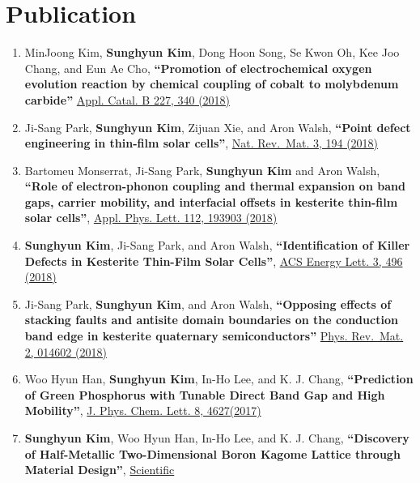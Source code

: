 \hypertarget{publication}{%
\section{Publication}\label{publication}}

\begin{enumerate}
\def\labelenumi{\arabic{enumi}.}
\item
  MinJoong Kim, \textbf{Sunghyun Kim}, Dong Hoon Song, Se Kwon Oh, Kee
  Joo Chang, and Eun Ae Cho, \textbf{``Promotion of electrochemical
  oxygen evolution reaction by chemical coupling of cobalt to molybdenum
  carbide''} \href{https://doi.org/10.1016/j.apcatb.2018.01.051}{Appl.
  Catal. B 227, 340 (2018)}
\item
  Ji-Sang Park, \textbf{Sunghyun Kim}, Zijuan Xie, and Aron Walsh,
  \textbf{``Point defect engineering in thin-film solar cells''},
  \href{https://doi.org/10.1038/s41578-018-0026-7}{Nat. Rev.~Mat. 3, 194
  (2018)}
\item
  Bartomeu Monserrat, Ji-Sang Park, \textbf{Sunghyun Kim} and Aron
  Walsh, \textbf{``Role of electron-phonon coupling and thermal
  expansion on band gaps, carrier mobility, and interfacial offsets in
  kesterite thin-film solar cells''},
  \href{https://doi.org/10.1063/1.5028186}{Appl. Phys. Lett. 112, 193903
  (2018)}
\item
  \textbf{Sunghyun Kim}, Ji-Sang Park, and Aron Walsh,
  \textbf{``Identification of Killer Defects in Kesterite Thin-Film
  Solar Cells''},
  \href{https://pubs.acs.org/doi/abs/10.1021/acsenergylett.7b01313}{ACS
  Energy Lett. 3, 496 (2018)}
\item
  Ji-Sang Park, \textbf{Sunghyun Kim}, and Aron Walsh,
  \textbf{``Opposing effects of stacking faults and antisite domain
  boundaries on the conduction band edge in kesterite quaternary
  semiconductors''}
  \href{https://journals.aps.org/prmaterials/abstract/10.1103/PhysRevMaterials.2.014602}{Phys.
  Rev.~Mat. 2, 014602 (2018)}
\item
  Woo Hyun Han, \textbf{Sunghyun Kim}, In-Ho Lee, and K. J. Chang,
  \textbf{``Prediction of Green Phosphorus with Tunable Direct Band Gap
  and High Mobility''},
  \href{https://pubs.acs.org/doi/10.1021/acs.jpclett.7b02153}{J. Phys.
  Chem. Lett. 8, 4627(2017)}
\item
  \textbf{Sunghyun Kim}, Woo Hyun Han, In-Ho Lee, and K. J. Chang,
  \textbf{``Discovery of Half-Metallic Two-Dimensional Boron Kagome
  Lattice through Material Design''},
  \href{https://www.nature.com/articles/s41598-017-07518-9}{Scientific
}
\end{enumerate}
